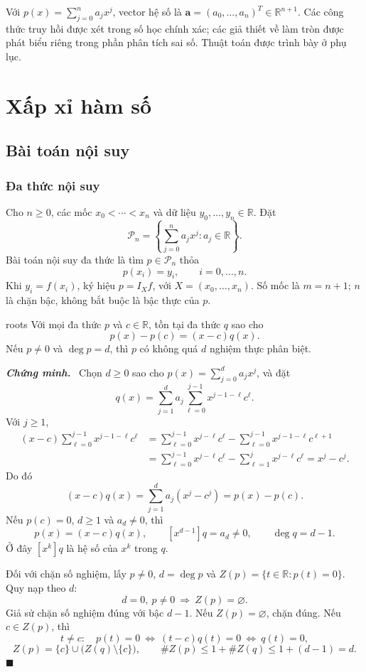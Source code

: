 \documentclass[12pt,a4paper,oneside]{book}
\numberwithin{algorithm}{chapter}
\theoremstyle{definition}
\newenvironment{chungminh}{\par\medskip\noindent\textbf{\textit{\color{mainblue}Chứng minh.}}\ }{\hfill$\blacksquare$\par\medskip}
\newcommand{\R}{\mathbb{R}}
\begin{document}
Với $p(x)=\sum_{j=0}^{n}a_jx^j$, vector hệ số là $\boldsymbol a=(a_0,\ldots,a_n)^T\in\R^{n+1}$. Các công thức truy hồi được xét trong số học chính xác; các giả thiết về làm tròn được phát biểu riêng trong phần phân tích sai số. Thuật toán được trình bày ở phụ lục.
\tableofcontents
\mainmatter

\chapter{Xấp xỉ hàm số}
\section{Bài toán nội suy}
\subsection{Đa thức nội suy}
Cho $n\geq0$, các mốc $x_0<\cdots<x_n$ và dữ liệu $y_0,\ldots,y_n\in\R$. Đặt
\[
 \mathcal P_n=\left\{\sum_{j=0}^{n}a_jx^j:a_j\in\R\right\}.
\]
Bài toán nội suy đa thức là tìm $p\in\mathcal P_n$ thỏa
\[
 p(x_i)=y_i,\qquad i=0,\ldots,n.
\]
Khi $y_i=f(x_i)$, ký hiệu $p=I_Xf$, với $X=(x_0,\ldots,x_n)$. Số mốc là $m=n+1$; $n$ là chặn bậc, không bắt buộc là bậc thực của $p$.

\begin{bode}{}{roots}
Với mọi đa thức $p$ và $c\in\R$, tồn tại đa thức $q$ sao cho
\[
 p(x)-p(c)=(x-c)q(x).
\]
Nếu $p\ne0$ và $\deg p=d$, thì $p$ có không quá $d$ nghiệm thực phân biệt.
\end{bode}
\begin{chungminh}
Chọn $d\geq0$ sao cho $p(x)=\sum_{j=0}^{d}a_jx^j$, và đặt
\[
 q(x)=\sum_{j=1}^{d}a_j\sum_{\ell=0}^{j-1}x^{j-1-\ell}c^\ell.
\]
Với $j\geq1$,
\begin{align*}
 (x-c)\sum_{\ell=0}^{j-1}x^{j-1-\ell}c^\ell
 &=\sum_{\ell=0}^{j-1}x^{j-\ell}c^\ell
   -\sum_{\ell=0}^{j-1}x^{j-1-\ell}c^{\ell+1}\\
 &=\sum_{\ell=0}^{j-1}x^{j-\ell}c^\ell
   -\sum_{\ell=1}^{j}x^{j-\ell}c^\ell
 =x^j-c^j.
\end{align*}
Do đó
\[
 (x-c)q(x)=\sum_{j=1}^{d}a_j(x^j-c^j)=p(x)-p(c).
\]
Nếu $p(c)=0$, $d\geq1$ và $a_d\ne0$, thì
\[
 p(x)=(x-c)q(x),\qquad [x^{d-1}]q=a_d\ne0,
 \qquad\deg q=d-1.
\]
Ở đây $[x^k]q$ là hệ số của $x^k$ trong $q$.

Đối với chặn số nghiệm, lấy $p\ne0$, $d=\deg p$ và $Z(p)=\{t\in\R:p(t)=0\}$. Quy nạp theo $d$:
\[
 d=0,\ p\ne0\ \Longrightarrow\ Z(p)=\varnothing.
\]
Giả sử chặn số nghiệm đúng với bậc $d-1$. Nếu $Z(p)=\varnothing$, chặn đúng. Nếu $c\in Z(p)$, thì
\[
 t\ne c:\quad p(t)=0
 \ \Longleftrightarrow\ (t-c)q(t)=0
 \ \Longleftrightarrow\ q(t)=0,
\]
\[
 Z(p)=\{c\}\cup\bigl(Z(q)\setminus\{c\}\bigr),
 \qquad\#Z(p)\leq1+\#Z(q)\leq1+(d-1)=d.
\]
\end{chungminh}
\end{document}
